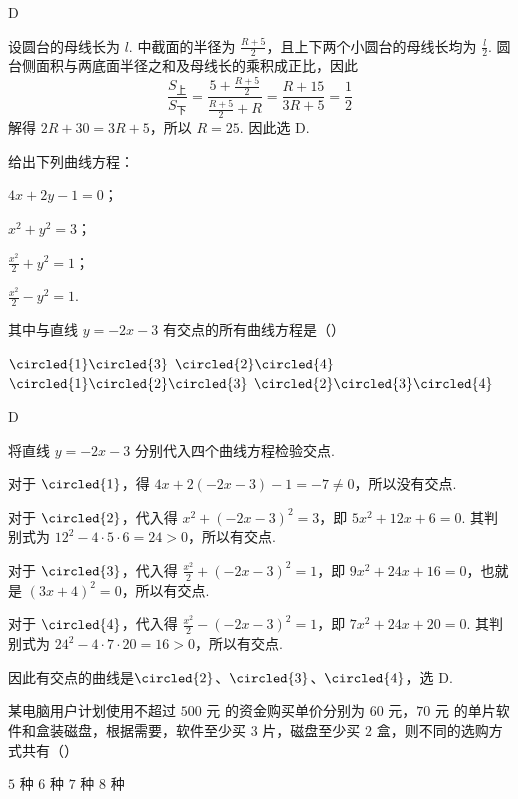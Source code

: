 \documentclass[UTF8,a4paper,oneside,11pt]{ctexbook}
\begin{document}
\begin{answer}
D
\end{answer}

\begin{solution}
设圆台的母线长为 \(l\). 中截面的半径为 \(\frac{R+5}{2}\)，且上下两个小圆台的母线长均为 \(\frac{l}{2}\). 圆台侧面积与两底面半径之和及母线长的乘积成正比，因此
\[
\frac{S_{\text{上}}}{S_{\text{下}}}
=\frac{5+\frac{R+5}{2}}{\frac{R+5}{2}+R}
=\frac{R+15}{3R+5}=\frac12
\]
解得 \(2R+30=3R+5\)，所以 \(R=25\). 因此选 D.
\end{solution}

\begin{problem}
给出下列曲线方程：

\begin{circlelist}
\item \(4x+2y-1=0\)；
\item \(x^2+y^2=3\)；
\item \(\frac{x^2}{2}+y^2=1\)；
\item \(\frac{x^2}{2}-y^2=1\).
\end{circlelist}

其中与直线 \(y=-2x-3\) 有交点的所有曲线方程是（\quad）

\choices
    {\(\circled{1}\circled{3}\)}
    {\(\circled{2}\circled{4}\)}
    {\(\circled{1}\circled{2}\circled{3}\)}
    {\(\circled{2}\circled{3}\circled{4}\)}
\end{problem}

\begin{answer}
D
\end{answer}

\begin{solution}
将直线 \(y=-2x-3\) 分别代入四个曲线方程检验交点.

对于 \(\circled{1}\)，得 \(4x+2(-2x-3)-1=-7\neq0\)，所以没有交点.

对于 \(\circled{2}\)，代入得
\(x^2+(-2x-3)^2=3\)，即 \(5x^2+12x+6=0\). 其判别式为 \(12^2-4\cdot5\cdot6=24>0\)，所以有交点.

对于 \(\circled{3}\)，代入得
\(\frac{x^2}{2}+(-2x-3)^2=1\)，即 \(9x^2+24x+16=0\)，也就是 \((3x+4)^2=0\)，所以有交点.

对于 \(\circled{4}\)，代入得
\(\frac{x^2}{2}-(-2x-3)^2=1\)，即 \(7x^2+24x+20=0\). 其判别式为 \(24^2-4\cdot7\cdot20=16>0\)，所以有交点.

因此有交点的曲线是\(\circled{2}\)、\(\circled{3}\)、\(\circled{4}\)，选 D.
\end{solution}

\begin{problem}
某电脑用户计划使用不超过 \(500\text{ 元}\) 的资金购买单价分别为 \(60\text{ 元}\)，\(70\text{ 元}\) 的单片软件和盒装磁盘，根据需要，软件至少买 \(3\text{ 片}\)，磁盘至少买 \(2\text{ 盒}\)，则不同的选购方式共有（\quad）

\choices
    {\(5\text{ 种}\)}
    {\(6\text{ 种}\)}
    {\(7\text{ 种}\)}
    {\(8\text{ 种}\)}
\end{problem}
\end{document}
